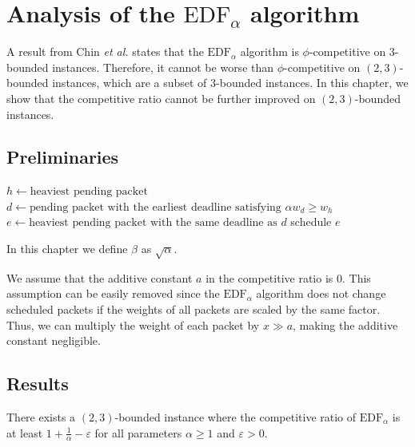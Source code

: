 \def\EDF{\text{EDF}_\alpha}
\def\OPT{\text{OPT}}

\chapter{Analysis of the $\EDF$ algorithm}

A result from Chin \emph{et al.} \cite{CHIN2006255} states that the $\EDF$
algorithm is $\phi$-competitive on $3$-bounded instances. Therefore, it cannot
be worse than $\phi$-competitive on $(2,3)$-bounded instances, which are a
subset of $3$-bounded instances. In this chapter, we show that the competitive
ratio cannot be further improved on $(2,3)$-bounded instances.

\section{Preliminaries}

\begin{algorithm}
\caption{The $\EDF$ Algorithm}
\begin{algorithmic}[1]

\State $h \gets \text{heaviest pending packet}$
\State $d \gets \text{pending packet with the earliest deadline satisfying } \alpha w_d \geq w_h$
\State $e \gets \text{heaviest pending packet with the same deadline as } d$
\State schedule $e$
\EndWhile
\end{algorithmic}
\end{algorithm}

In this chapter we define $\beta$ as $\sqrt{\alpha}$.

We assume that the additive constant $a$ in the competitive ratio is $0$. This
assumption can be easily removed since the $\EDF$ algorithm does not change
scheduled packets if the weights of all packets are scaled by the same factor.
Thus, we can multiply the weight of each packet by $x \gg a$, making
the additive constant negligible. 

\section{Results}

\begin{lemma}\label{lem:edf-I1}
There exists a $(2,3)$-bounded instance where the competitive ratio of $\EDF$
is at least $1 + \frac{1}{\alpha} - \varepsilon$ for all parameters $\alpha \geq 1$
and $\varepsilon > 0$.
\end{lemma}


